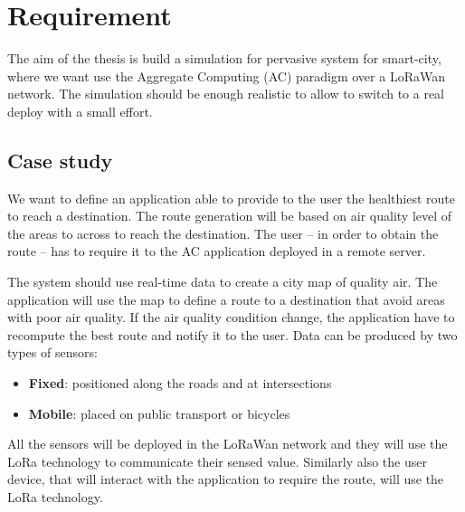 \chapter{Requirement}
The aim of the thesis is build a simulation for pervasive system for smart-city, where we want use the Aggregate Computing (AC) paradigm over a LoRaWan network. The simulation should be enough realistic to allow to switch to a real deploy with a small effort.

\section{Case study}

We want to define an application able to provide to the user the healthiest route to reach a destination. The route generation will be based on air quality level of the areas to across to reach the destination. The user -- in order to obtain the route -- has to require it to the AC application deployed in a remote server.

The system should use real-time data to create a city map of quality air.
The application will use the map to define a route to a destination that avoid areas with poor air quality.
If the air quality condition change, the application have to recompute the best route and notify it to the user. 
Data can be produced by two types of sensors:
\begin{itemize}
    \item \textbf{Fixed}: positioned along the roads and at intersections
    \item \textbf{Mobile}: placed on public transport or bicycles
\end{itemize}

All the sensors will be deployed in the LoRaWan network and they will use the LoRa technology to communicate their sensed value. Similarly also the user device, that will interact with the application to require the route, will use the LoRa technology.